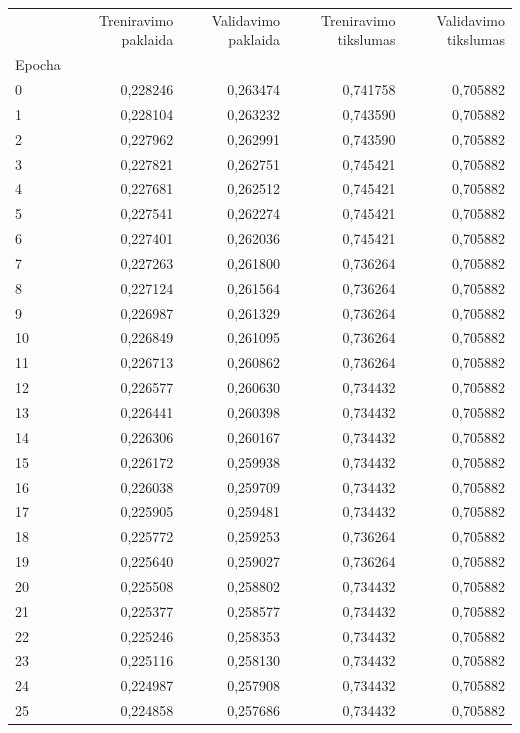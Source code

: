 \begin{tabular}{lrrrr}
\toprule
 & Treniravimo paklaida & Validavimo paklaida & Treniravimo tikslumas & Validavimo tikslumas \\
Epocha &  &  &  &  \\
\midrule
0 & 0,228246 & 0,263474 & 0,741758 & 0,705882 \\
1 & 0,228104 & 0,263232 & 0,743590 & 0,705882 \\
2 & 0,227962 & 0,262991 & 0,743590 & 0,705882 \\
3 & 0,227821 & 0,262751 & 0,745421 & 0,705882 \\
4 & 0,227681 & 0,262512 & 0,745421 & 0,705882 \\
5 & 0,227541 & 0,262274 & 0,745421 & 0,705882 \\
6 & 0,227401 & 0,262036 & 0,745421 & 0,705882 \\
7 & 0,227263 & 0,261800 & 0,736264 & 0,705882 \\
8 & 0,227124 & 0,261564 & 0,736264 & 0,705882 \\
9 & 0,226987 & 0,261329 & 0,736264 & 0,705882 \\
10 & 0,226849 & 0,261095 & 0,736264 & 0,705882 \\
11 & 0,226713 & 0,260862 & 0,736264 & 0,705882 \\
12 & 0,226577 & 0,260630 & 0,734432 & 0,705882 \\
13 & 0,226441 & 0,260398 & 0,734432 & 0,705882 \\
14 & 0,226306 & 0,260167 & 0,734432 & 0,705882 \\
15 & 0,226172 & 0,259938 & 0,734432 & 0,705882 \\
16 & 0,226038 & 0,259709 & 0,734432 & 0,705882 \\
17 & 0,225905 & 0,259481 & 0,734432 & 0,705882 \\
18 & 0,225772 & 0,259253 & 0,736264 & 0,705882 \\
19 & 0,225640 & 0,259027 & 0,736264 & 0,705882 \\
20 & 0,225508 & 0,258802 & 0,734432 & 0,705882 \\
21 & 0,225377 & 0,258577 & 0,734432 & 0,705882 \\
22 & 0,225246 & 0,258353 & 0,734432 & 0,705882 \\
23 & 0,225116 & 0,258130 & 0,734432 & 0,705882 \\
24 & 0,224987 & 0,257908 & 0,734432 & 0,705882 \\
25 & 0,224858 & 0,257686 & 0,734432 & 0,705882 \\

\end{tabular}

